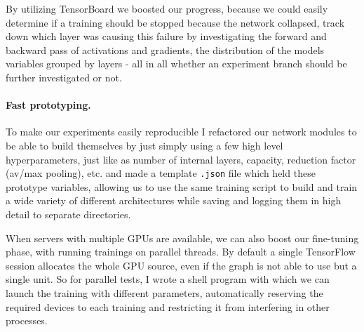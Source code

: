 \begin{figure}[h]
  \centering
  \begin{floatrow}
  \end{floatrow}
  \label{fig:tf-score}
\end{figure}

By utilizing TensorBoard we boosted our progress, because we could easily determine if a training should be stopped because the network collapsed, track down which layer was causing this failure by investigating the forward and backward pass of activations and gradients, the distribution of the models variables grouped by layers - all in all whether an experiment branch should be further investigated or not.

\paragraph{Fast prototyping.}
To make our experiments easily reproducible I refactored our network modules to be able to build themselves by just simply using a few high level hyperparameters, just like as number of internal layers, capacity, reduction factor (av/max pooling), etc. and made a template \texttt{.json} file which held these prototype variables, allowing us to use the same training script to build and train a wide variety of different architectures while saving and logging them in high detail to separate directories.

When servers with multiple GPUs are available, we can also boost our fine-tuning phase, with running trainings on parallel threads.
By default a single TensorFlow session allocates the whole GPU source, even if the graph is not able to use but a single unit.
So for parallel tests, I wrote a shell program with which we can launch the training with different parameters, automatically reserving the required devices to each training and restricting it from interfering in other processes.
